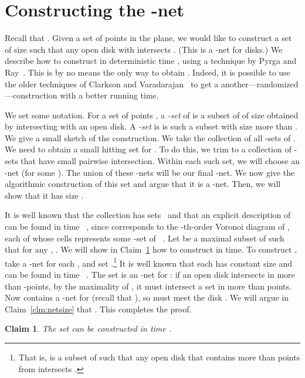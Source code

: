 \documentclass{siamltex}
\newtheorem{claim}[theorem]{Claim}
\begin{document}
\appendix
\section{Constructing the -net }\label{app:epsnet}
Recall that .
Given a set  of  points in the plane,
we would like to construct a set  of size
 such that any open disk  with 
 intersects . (This is
a -net for disks.)
We describe how to construct  in deterministic
time , using  a technique by
Pyrga and Ray~\cite{PyrgaRa08}. This is by no means the
only way to obtain . Indeed, it is possible 
to use the older techniques of Clarkson and Varadarajan~\cite{CV}
to get a another---randomized---construction with a better running time.

We set some notation. For a set of points , a \emph{-set}
of  is a subset of  of size  obtained by intersecting 
with an open disk. A \emph{-set} is is such a subset with size 
more than .
We give a small sketch of the construction. We take the
collection  of  all -sets
of . 
We need to obtain a small hitting set for .
To do this, we trim  to
a collection of -sets that have small pairwise intersection. 
Within each
such set, we will choose an -net (for some  ). The union
of these -nets will be our final -net.
We now give the algorithmic construction of this set and argue that 
it is a -net. Then, we will show that it has size .

It is well known that the collection
 has  sets~\cite{CS89,Lee82} and
that an explicit description of  
can be found in time ~\cite{AggarwalGuSaSh89,Lee82},
since  corresponds to the 
-th-order Voronoi diagram of , each of whose
cells represents some -set of ~\cite{Lee82}.
Let  be a maximal subset
of  such that for any ,
. 
We will show in Claim~\ref{clm:con-I} how to
construct  in  time.
To construct , take a -net  for each ,
and set .\footnote{That is,
 is a subset of  such that any open disk that contains more than
 points from  intersects .} It is well known that each
 has constant size and can be found in time 
~\cite[p. 180, Proof~I]{Chazelle00}.
The set  is an -net for : if an open disk  intersects
 in more than -points, by the maximality of , 
it must intersect a set  in more than  points. 
Now  contains a -net for  (recall that ),
so   must meet the disk .
We will argue in Claim~\ref{clm:netsize} that . 
This completes the proof.
\medskip

\begin{claim} \label{clm:con-I} The set  can
be constructed in time .
\end{claim}
\end{document}
